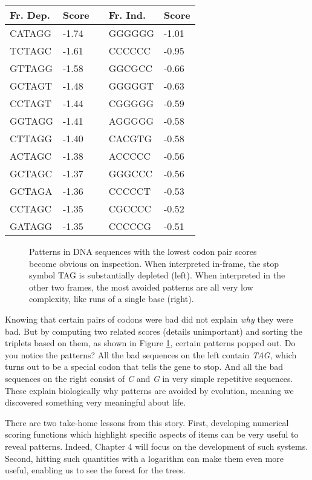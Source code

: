 \documentclass[10pt]{article}
\begin{document}
\begin{center}
\begin{tabular}{|l|l|l|l|l|}
\hline
Fr. Dep. & Score &  & Fr. Ind. & Score \\
\hline
CATAGG & -1.74 &  & GGGGGG & -1.01 \\
\hline
TCTAGC & -1.61 &  & CCCCCC & -0.95 \\
\hline
GTTAGG & -1.58 &  & GGCGCC & -0.66 \\
\hline
GCTAGT & -1.48 &  & GGGGGT & -0.63 \\
\hline
CCTAGT & -1.44 &  & CGGGGG & -0.59 \\
\hline
GGTAGG & -1.41 &  & AGGGGG & -0.58 \\
\hline
CTTAGG & -1.40 &  & CACGTG & -0.58 \\
\hline
ACTAGC & -1.38 &  & ACCCCC & -0.56 \\
\hline
GCTAGC & -1.37 &  & GGGCCC & -0.56 \\
\hline
GCTAGA & -1.36 &  & CCCCCT & -0.53 \\
\hline
CCTAGC & -1.35 &  & CGCCCC & -0.52 \\
\hline
GATAGG & -1.35 &  & CCCCCG & -0.51 \\
\hline
\end{tabular}
\end{center}

\begin{figure}[h]
    \centering
    \caption{Patterns in DNA sequences with the lowest codon pair scores become obvious on inspection. When interpreted in-frame, the stop symbol TAG is substantially depleted (left). When interpreted in the other two frames, the most avoided patterns are all very low complexity, like runs of a single base (right).}
    \label{figure:patterns_dna}
\end{figure}

Knowing that certain pairs of codons were bad did not explain \textit{why} they were bad. But by computing two related scores (details unimportant) and sorting the triplets based on them, as shown in Figure \ref{figure:patterns_dna}, certain patterns popped out. Do you notice the patterns? All the bad sequences on the left contain \textit{TAG}, which turns out to be a special codon that tells the gene to stop. And all the bad sequences on the right consist of \textit{C} and \textit{G} in very simple repetitive sequences. These explain biologically why patterns are avoided by evolution, meaning we discovered something very meaningful about life.

There are two take-home lessons from this story. First, developing numerical scoring functions which highlight specific aspects of items can be very useful to reveal patterns. Indeed, Chapter 4 will focus on the development of such systems. Second, hitting such quantities with a logarithm can make them even more useful, enabling us to see the forest for the trees.
\end{document}
